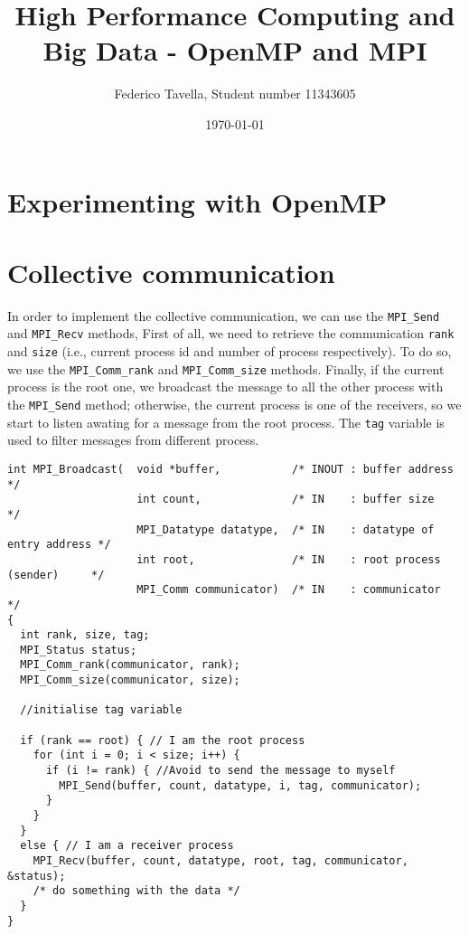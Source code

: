 \documentclass[a4paper]{article}
\title{High Performance Computing and Big Data - OpenMP and MPI}
\author{Federico Tavella, Student number 11343605}
\date{\today}
\begin{document}
\maketitle

\section{Experimenting with OpenMP}


\newpage

\section{Collective communication}

In order to implement the collective communication, we can use the \texttt{MPI\_Send} and \texttt{MPI\_Recv} methods, First of all, we need to retrieve the communication \texttt{rank} and \texttt{size} (i.e., current process id and number of process respectively). To do so, we use the \texttt{MPI\_Comm\_rank} and \texttt{MPI\_Comm\_size} methods. Finally, if the current process is the root one, we broadcast the message to all the other process with the \texttt{MPI\_Send} method; otherwise, the current process is one of the receivers, so we start to listen awating for a message from the root process. The \texttt{tag} variable is used to filter messages from different process.

\begin{verbatim}
int MPI_Broadcast(  void *buffer,           /* INOUT : buffer address            */
                    int count,              /* IN    : buffer size               */
                    MPI_Datatype datatype,  /* IN    : datatype of entry address */
                    int root,               /* IN    : root process (sender)     */
                    MPI_Comm communicator)  /* IN    : communicator              */
{
  int rank, size, tag;
  MPI_Status status;
  MPI_Comm_rank(communicator, rank);
  MPI_Comm_size(communicator, size);

  //initialise tag variable

  if (rank == root) { // I am the root process
    for (int i = 0; i < size; i++) {
      if (i != rank) { //Avoid to send the message to myself
        MPI_Send(buffer, count, datatype, i, tag, communicator);
      }
    }
  }
  else { // I am a receiver process
    MPI_Recv(buffer, count, datatype, root, tag, communicator, &status);
    /* do something with the data */
  }
}

\end{verbatim}
\end{document}

